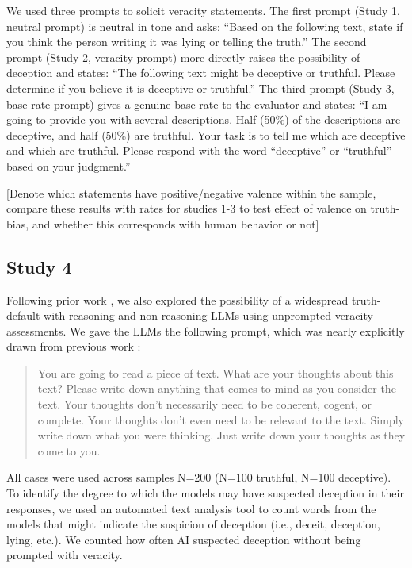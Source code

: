 \documentclass{article}
\begin{document}
We used three prompts to solicit veracity statements. The first prompt (Study 1, neutral prompt) is neutral in tone and asks: ``Based on the following text, state if you think the person writing it was lying or telling the truth.'' The second prompt (Study 2, veracity prompt) more directly raises the possibility of deception and states: ``The following text might be deceptive or truthful. Please determine if you believe it is deceptive or truthful.'' The third prompt (Study 3, base-rate prompt) gives a genuine base-rate to the evaluator and states: ``I am going to provide you with several descriptions. Half (50\%) of the descriptions are deceptive, and half (50\%) are truthful. Your task is to tell me which are deceptive and which are truthful. Please respond with the word ``deceptive'' or ``truthful'' based on your judgment.''

[Denote which statements have positive/negative valence within the sample, compare these results with rates for studies 1-3 to test effect of valence on truth-bias, and whether this corresponds with human behavior or not]

\subsection{Study 4}

Following prior work \citep{markowitz_generative_2024, clare_documenting_2019}, we also explored the possibility of a widespread truth-default with reasoning and non-reasoning LLMs using unprompted veracity assessments. We gave the LLMs the following prompt, which was nearly explicitly drawn from previous work \citep{clare_documenting_2019}:

\begin{quote}
    You are going to read a piece of text. What are your thoughts about this text? Please write down anything that comes to mind as you consider the text. Your thoughts don’t necessarily need to be coherent, cogent, or complete. Your thoughts don’t even need to be relevant to the text. Simply write down what you were thinking. Just write down your thoughts as they come to you.
\end{quote}

All cases were used across samples N=200 (N=100 truthful, N=100 deceptive). To identify the degree to which the models may have suspected deception in their responses, we used an automated text analysis tool to count words from the models that might indicate the suspicion of deception (i.e., deceit, deception, lying, etc.). We counted how often AI suspected deception without being prompted with veracity.
\end{document}
